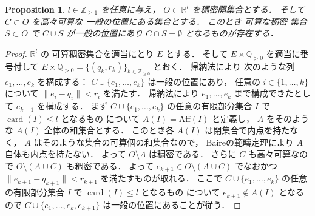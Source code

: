 \documentclass[leqno, a4paper, 12pt]{jsarticle}
\theoremstyle{plain}
\newtheorem{prop}[thm]{Proposition}
\theoremstyle{definition}
\theoremstyle{remark}
\newcommand{\zz}{\mathbb{Z}}
\newcommand{\qq}{\mathbb{Q}}
\newcommand{\rr}{\mathbb{R}}
\DeclareMathOperator{\card}{\mathrm{card}}
\newcommand{\yoaff}[1]{\mathrm{Aff}(#1)}
\numberwithin{equation}{section}
\begin{document}
\begin{prop}\label{prop:densegp}
$l\in \zz_{\ge 1}$
を任意に与え，
$O\subset \rr^{l}$
を稠密開集合とする．
そして
$C\subset O$
を高々可算な
一般の位置にある集合とする．
このとき
可算な稠密
集合
$S\subset O$
で
$C\cup S$
が一般の位置にあり
$C\cap S=\emptyset$
となるものが存在する．
\end{prop}
\begin{proof}
$\rr^{l}$
の
可算稠密集合を適当にとり
$E$
とする．
そして
$E\times \qq_{>0}$
を適当に番号付して
$E\times \qq_{> 0}=\{(q_{k}, r_{k})\}_{k\in \zz_{\ge 0}}$
とおく．
帰納法により
次のような列
$e_{1}, \dots, e_{k}$
を構成する：
$C\cup \{e_{1}, \dots, e_{k}\}$
は一般の位置にあり，
任意の
$i\in \{1, \dots, k\}$
について
$\lVert e_{i} - q_{i}\lVert < r_{i}$
を満たす．
帰納法により
$e_{1}, \dots, e_{k}$
まで構成できたとして
$e_{k+1}$
を構成する．
まず
$C\cup \{e_{1}, \dots, e_{k}\}$
の任意の有限部分集合
$I$
で
$\card(I)\le l$
となるもの
について
$A(I)=\yoaff{I}$
と定義し，
$A$
をそのような
$A(I)$
全体の和集合とする．
このとき各
$A(I)$
は閉集合で内点を持たなく，
$A$
はそのような集合の可算個の和集合なので，
Baireの範疇定理により
$A$
自体も内点を持たない．
よって
$O\setminus A$
は稠密である．
さらに
$C$
も高々可算なので
$O\setminus (A\cup C)$
も稠密である．
よって
$e_{k+1} \in O\setminus (A\cup C)$
でなおかつ
$\lVert e_{k+1} - q_{k+1}\lVert < r_{k+1}$
を満たすものが取れる．
ここで
$C\cup \{e_{1}, \dots, e_{k}\}$
の任意の有限部分集合
$I$
で
$\card(I)\le l$
となるもの
について
$e_{k+1}\not \in A(I)$
となるので
$C\cup \{e_{1},\dots, e_{k}, e_{k+1}\}$
は一般の位置にあることが従う．
\end{proof}
\end{document}
